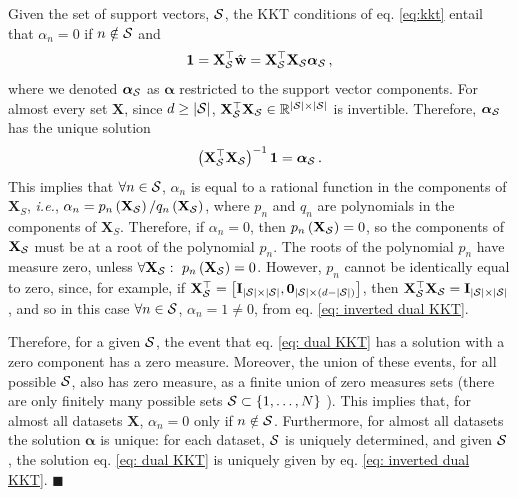 \documentclass[twoside,11pt,english]{article}
\begin{document}
Given the set of support vectors, $\mathcal{S}$, the KKT conditions of eq.
\ref{eq:kkt} entail that $\alpha_{n}=0$ if $n\notin\mathcal{S}$ and 
\begin{equation}
\mathbf{1}=\mathbf{X}_{\mathcal{S}}^{\top}\hat{\mathbf{w}}=\mathbf{X}_{\mathcal{S}}^{\top}\mathbf{X}_{\mathcal{S}}\boldsymbol{\alpha}_{\mathcal{S}}\,,\label{eq: dual KKT}
\end{equation}
where we denoted \textbf{$\boldsymbol{\alpha}_{\mathcal{S}}$ }as $\boldsymbol{\alpha}$
restricted to the support vector components. For almost every set
$\mathbf{X}$, since $d\geq\left|\mathcal{S}\right|$, $\mathbf{X}_{\mathcal{S}}^{\top}\mathbf{X}_{\mathcal{S}}\in\mathbb{R}^{\left|\mathcal{S}\right|\times\left|\mathcal{S}\right|}$
is invertible. Therefore, $\boldsymbol{\alpha}_{\mathcal{S}}$ has the unique
solution 
\begin{equation}
\left(\mathbf{X}_{\mathcal{S}}^{\top}\mathbf{X}_{\mathcal{S}}\right)^{-1}\mathbf{1}=\boldsymbol{\alpha}_{\mathcal{S}}\,.\label{eq: inverted dual KKT}
\end{equation}
This implies that $\forall n\in\mathcal{S}$, $\alpha_{n}$ is equal to a
rational function in the components of $\mathbf{X}_{S}$, \emph{i.e.},
$\alpha_{n}=p_{n}\left(\text{\textbf{X}}_{\mathcal{S}}\right)/q_{n}\left(\text{\textbf{X}}_{\mathcal{S}}\right)$,
where $p_{n}$ and $q_{n}$ are polynomials in the components of $\mathbf{X}_{S}$.
Therefore, if $\alpha_{n}=0$, then $p_{n}\left(\text{\textbf{X}}_{\mathcal{S}}\right)=0$,
so the components of $\mathbf{X}_{\mathcal{S}}$ must be at a root of the
polynomial $p_{n}$. The roots of the polynomial $p_{n}$ have measure
zero, unless $\forall\mathbf{X}_{\mathcal{S}}:\,\,p_{n}\left(\text{\textbf{X}}_{\mathcal{S}}\right)=0$.
However, $p_{n}$ cannot be identically equal to zero, since, for
example, if $\mathbf{X}_{\mathcal{S}}^{\top}=\left[\mathbf{I}_{\left|\mathcal{S}\right|\times\left|\mathcal{S}\right|},\boldsymbol{0}_{\left|\mathcal{S}\right|\times\left(d-\left|\mathcal{S}\right|\right)}\right]$,
then $\mathbf{X}_{\mathcal{S}}^{\top}\mathbf{X}_{\mathcal{S}}=\mathbf{I}_{\left|\mathcal{S}\right|\times\left|\mathcal{S}\right|}$,
and so in this case $\forall n\in\mathcal{S}$, $\alpha_{n}=1\neq0$, from
eq. \ref{eq: inverted dual KKT}.

Therefore, for a given $\mathcal{S}$, the event that \textquotedbl{}eq.
\ref{eq: dual KKT} has a solution with a zero component\textquotedbl{}
has a zero measure. Moreover, the union of these events, for all possible
$\mathcal{S}$, also has zero measure, as a finite union of zero measures
sets (there are only finitely many possible sets $\mathcal{S}\subset\left\{ 1,\dots,N\right\} $
). This implies that, for almost all datasets $\mathbf{X}$, $\alpha_{n}=0$
only if $n\notin\mathcal{S}$. Furthermore, for almost all datasets the solution
$\boldsymbol{\alpha}$ is unique: for each dataset, $\mathcal{S}$ is uniquely
determined, and given $\mathcal{S}$ , the solution eq. \ref{eq: dual KKT}
is uniquely given by eq. \ref{eq: inverted dual KKT}. $\blacksquare$
\end{document}
